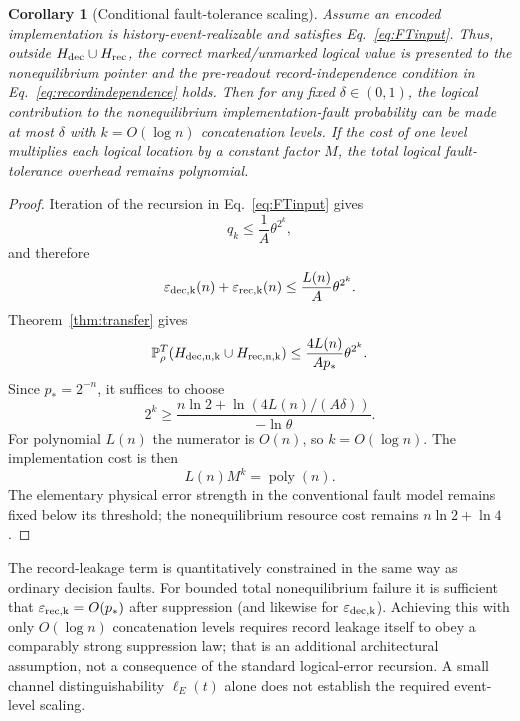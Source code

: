 \documentclass[pdflatex,sn-mathphys-num]{sn-jnl}
\theoremstyle{thmstyleone}
\newtheorem{corollary}{Corollary}
\begin{document}
\begin{corollary}[Conditional fault-tolerance scaling]
\label{cor:FT}
Assume an encoded implementation is history-event-realizable and satisfies Eq.~\eqref{eq:FTinput}. Thus, outside $H_{\rm dec}\cup H_{\rm rec}$, the correct marked/unmarked logical value is presented to the nonequilibrium pointer and the pre-readout record-independence condition in Eq.~\eqref{eq:recordindependence} holds. Then for any fixed $\delta\in(0,1)$, the logical contribution to the nonequilibrium implementation-fault probability can be made at most $\delta$ with $k=O(\log n)$ concatenation levels. If the cost of one level multiplies each logical location by a constant factor $M$, the total logical fault-tolerance overhead remains polynomial.
\end{corollary}

\begin{proof}
Iteration of the recursion in Eq.~\eqref{eq:FTinput} gives
\begin{equation}
q_k\le\frac1A\theta^{2^k},
\end{equation}
and therefore
\begin{equation}
\varepsilon_{\rm dec,k}(n)+\varepsilon_{\rm rec,k}(n)
\le\frac{L(n)}A\theta^{2^k}.
\label{eq:epsilonk}
\end{equation}
Theorem~\ref{thm:transfer} gives
\begin{equation}
\mathbb P_{\rho}^{T}(H_{\rm dec,n,k}\cup H_{\rm rec,n,k})
\le\frac{4L(n)}{A p_*}\theta^{2^k}.
\label{eq:neqbad}
\end{equation}
Since $p_*=2^{-n}$, it suffices to choose
\begin{equation}
2^k\ge
\frac{n\ln2+\ln\!\left(4L(n)/(A\delta)\right)}{-\ln\theta}.
\label{eq:kbound}
\end{equation}
For polynomial $L(n)$ the numerator is $O(n)$, so $k=O(\log n)$. The implementation cost is then
\begin{equation}
L(n)M^k=\operatorname{poly}(n).
\end{equation}
The elementary physical error strength in the conventional fault model remains fixed below its threshold; the nonequilibrium resource cost remains $n\ln2+\ln4$.
\end{proof}

The record-leakage term is quantitatively constrained in the same way as ordinary decision faults. For bounded total nonequilibrium failure it is sufficient that $\varepsilon_{\rm rec,k}=O(p_*)$ after suppression (and likewise for $\varepsilon_{\rm dec,k}$). Achieving this with only $O(\log n)$ concatenation levels requires record leakage itself to obey a comparably strong suppression law; that is an additional architectural assumption, not a consequence of the standard logical-error recursion. A small channel distinguishability $\ell_E(t)$ alone does not establish the required event-level scaling.
\end{document}
